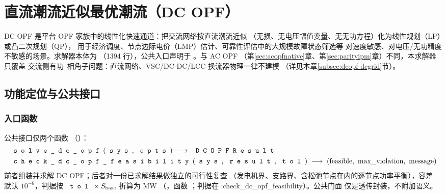 \section{直流潮流近似最优潮流（DC OPF）}\label{sec:dcopf}

DC OPF 是平台 OPF 家族中的线性化快速通道：把交流网络按直流潮流近似
（无损、无电压幅值变量、无无功方程）化为线性规划（LP）或凸二次规划（QP），
用于经济调度、节点边际电价（LMP）估计、可靠性评估中的大规模故障状态筛选等
对速度敏感、对电压/无功精度不敏感的场景。求解器本体为
（1394 行），公共入口声明于
。与 AC OPF
（第\ref{sec:acopfnative}章、第\ref{sec:parityipm}章）不同，本求解器只覆盖
交流侧有功--相角子问题：直流网络、VSC/DC-DC/LCC 换流器物理一律不建模
（详见本章\ref{subsec:dcopf-dcgrid}节）。

\subsection{功能定位与公共接口}


\subsubsection*{入口函数}
公共接口仅两个函数
（）：
\begin{align*}
&\text{\srcpath{solve\_dc\_opf}(\fld{sys}, \fld{opts})} \;\longrightarrow\;
  \text{\fld{DCOPFResult}}\\
&\text{\srcpath{check\_dc\_opf\_feasibility}(\fld{sys}, \fld{result}, \fld{tol})}
  \;\longrightarrow\; (\text{feasible},\ \text{max\_violation},\ \text{message})
\end{align*}
前者组装并求解 DC OPF；后者对一份已求解结果做独立的可行性复查
（发电机界、支路界、含松弛节点在内的逐节点功率平衡），容差  默认
$10^{-6}$，判据按 $\fld{tol}\times S_{\mathrm{base}}$ 折算为 MW
（，函数
；判据在 :check\_dc\_opf\_feasibility）。公共门面
 仅是透传封装，不附加语义。

